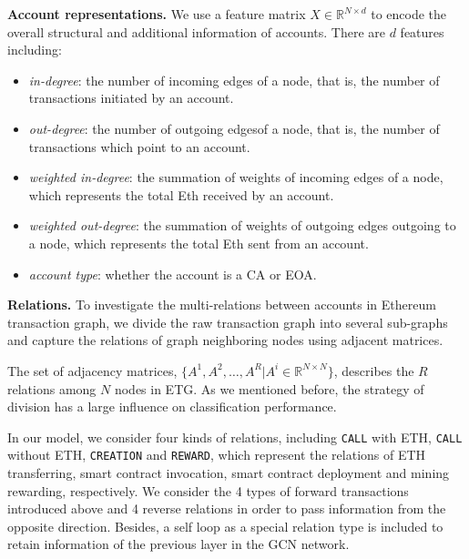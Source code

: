 \textbf{Account representations.} We use a feature matrix $X \in \mathbb{R}^{N \times d}$ to encode the overall structural and additional information of accounts. There are $d$ features including:
\begin{itemize}
	\item \emph{in-degree}: the number of incoming edges of a node, that is, the number of transactions initiated by an account.
	\item \emph{out-degree}: the number of outgoing edgesof a node, that is, the number of transactions which point to an account.
	\item \emph{weighted in-degree}: the summation of weights of incoming edges of a node, which represents the total Eth received by an account. 
	\item \emph{weighted out-degree}: the summation of weights of outgoing edges outgoing to a node, which represents the total Eth sent from an account. 
	\item \emph{account type}: whether the account is a CA or EOA.
\end{itemize}



\textbf{Relations.} To investigate the multi-relations between accounts in Ethereum transaction graph, we divide the raw transaction graph into several sub-graphs and capture the relations of graph neighboring nodes using adjacent matrices. 

The set of adjacency matrices, $\{A^1,A^2,\dots,A^R|A^i\in \mathbb{R}^{N \times N}\}$, describes the $R$ relations among $N$ nodes in ETG. As we mentioned before, the strategy of division has a large influence on classification performance. 

In our model, we consider four kinds of relations, including \texttt{CALL} with ETH, \texttt{CALL} without ETH, \texttt{CREATION} and \texttt{REWARD}, which represent the relations of ETH transferring, smart contract invocation, smart contract deployment and mining rewarding, respectively. We consider the 4 types of forward transactions introduced above and 4 reverse relations in order to pass information from the opposite direction. Besides, a self loop as a special relation type is included to retain information of the previous layer in the GCN network. 

